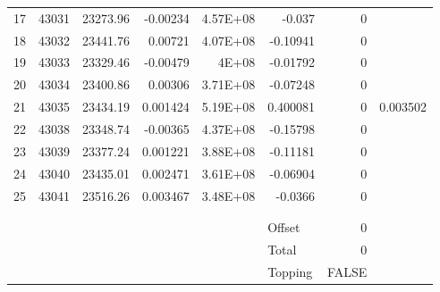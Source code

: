 \documentclass{article}
\begin{document}
\begin{table}[htbp]
\begin{tabular}{rrrrrlrr}
    17    & 43031 & 23273.96 & -0.00234 & 4.57E+08 & \multicolumn{1}{r}{-0.037} & 0     &  \\
    18    & 43032 & 23441.76 & 0.00721 & 4.07E+08 & \multicolumn{1}{r}{-0.10941} & 0     &  \\
    19    & 43033 & 23329.46 & -0.00479 & 4E+08 & \multicolumn{1}{r}{-0.01792} & 0     &  \\
    20    & 43034 & 23400.86 & 0.00306 & 3.71E+08 & \multicolumn{1}{r}{-0.07248} & 0     &  \\
    21    & 43035 & 23434.19 & 0.001424 & 5.19E+08 & \multicolumn{1}{r}{0.400081} & 0     & 0.003502 \\
    22    & 43038 & 23348.74 & -0.00365 & 4.37E+08 & \multicolumn{1}{r}{-0.15798} & 0     &  \\
    23    & 43039 & 23377.24 & 0.001221 & 3.88E+08 & \multicolumn{1}{r}{-0.11181} & 0     &  \\
    24    & 43040 & 23435.01 & 0.002471 & 3.61E+08 & \multicolumn{1}{r}{-0.06904} & 0     &  \\
    25    & 43041 & 23516.26 & 0.003467 & 3.48E+08 & \multicolumn{1}{r}{-0.0366} & 0     &  \\
          &       &       &       &       &       &       &  \\
          &       &       &       &       &       &       &  \\
          &       &       &       &       & Offset & 0     &  \\
          &       &       &       &       & Total & 0     &  \\
          &       &       &       &       & Topping & FALSE &  \\
    \end{tabular}%
  \label{tab:addlabel}%
\end{table}%
\end{document}
